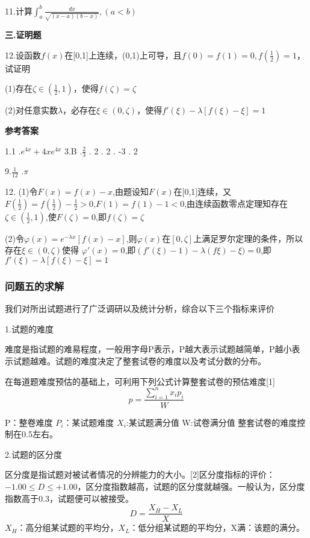 \documentclass{ctexart}
\begin{document}
11.计算$\int_{a}^{b}\frac{dx}{\sqrt{(x-a)(b-x)}},(a<b)$

\textbf{三.证明题}

12.设函数$f(x)$在[0,1]上连续，(0,1)上可导，且$f(0)=f(1)=0,f(\frac{1}{2})=1$，试证明

(1)存在$\zeta\in(\frac{1}{2},1)$，使得$f(\zeta)=\zeta$

(2)对任意实数$\lambda$，必存在$\xi\in(0,\zeta)$，使得$f'(\xi)-\lambda[f(\xi)-\xi]=1$

\begin{center}
\textbf{参考答案}
\end{center}

1.1  .$e^{4x}+4xe^{4x}$  \qquad  3.B  .$\frac{2}{3}$	.  2	.  2  .  -3  .   2	 	

9.$\frac{1}{12}$
.$\pi$

12.
(1)令$F(x)=f(x)-x$,由题设知$F(x)$在[0,1]连续，又$F(\frac{1}{2})=f(\frac{1}{2})-\frac{1}{2}>0$,$F(1)=f(1)-1<0$,由连续函数零点定理知存在$\zeta\in(\frac{1}{2},1)$,使$F(\zeta)=0$,即$f(\zeta)=\zeta$

(2)令$\varphi(x)=e^{-\lambda x}[f(x)-x]$,则$\varphi(x)$在$[0,\zeta]$上满足罗尔定理的条件，所以存在$\xi\in(0,\zeta)$使得
$\varphi'(x)=0$,即$(f'(\xi)-1)-\lambda(f\xi)-\xi)=0$,即$f'(\xi)-\lambda[f(\xi)-\xi]=1$

\subsubsection{问题五的求解}

我们对所出试题进行了广泛调研以及统计分析，综合以下三个指标来评价

1.试题的难度

难度是指试题的难易程度，一般用字母P表示，P越大表示试题越简单，P越小表示试题越难。试题的难度决定了整套试卷的难度以及考试分数的分布。

在每道题难度预估的基础上，可利用下列公式计算整套试卷的预估难度[1]
     $$p=\frac{\sum\limits_{i=1}^{n}x_{i}p_{i}}{W}$$
	
 P：整卷难度    $P_{i}$：某试题难度    $X_{i}$:某试题满分值     W:试卷满分值
整套试卷的难度控制在0.5左右。

2.试题的区分度

区分度是指试题对被试者情况的分辨能力的大小。[2]区分度指标的评价： $-1.00\leq D\leq+1.00$，区分度指数越高，试题的区分度就越强。一般认为，区分度指数高于0.3，试题便可以被接受。
                $$D=\frac{X_{H}-X_{L}}{X}$$
$X_{H}$：高分组某试题的平均分，$X_{L}$：低分组某试题的平均分，X满：该题的满分。
\end{document}
